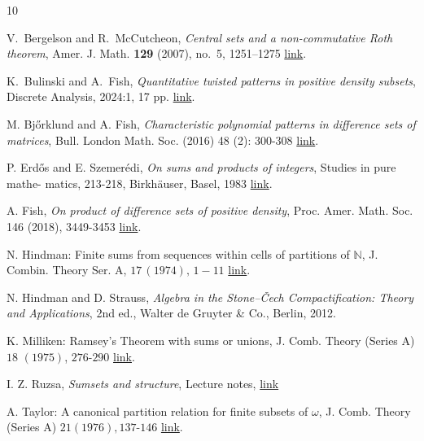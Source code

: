 \documentclass{article}
\theoremstyle{Theorem}
\theoremstyle{definition}
\begin{document}
\begin{thebibliography}{10}

 V.~Bergelson and R.~McCutcheon, \emph{Central sets and a non-commutative Roth theorem}, Amer. J. Math. \textbf{129} (2007), no.~5, 1251--1275 \href{https://doi.org/10.1353/AJM.2007.0031}{link}.

 K.~Bulinski and A.~Fish, \emph{Quantitative twisted patterns in positive density subsets}, Discrete Analysis, 2024:1, 17 pp. \href{https://doi.org/10.48550/arXiv.2102.05862}{link}.

  M. Bj\H{o}rklund and A. Fish, \emph{Characteristic polynomial
patterns in difference sets of matrices}, Bull. London Math. Soc. (2016)
48 (2): 300-308 \href{https://doi.org/10.1112/blms/bdw008}{link}.


 P. Erd\H{o}s and E. Szemer\'{e}di, \emph{On sums and
products of integers}, Studies in pure mathe- matics, 213-218, Birkh\"{a}user,
Basel, 1983 \href{https://doi.org/10.1007/978-3-0348-5438-2_19}{link}.

 A. Fish, \emph{On product of difference sets of positive
density}, Proc. Amer. Math. Soc. 146 (2018), 3449-3453 \href{http://dx.doi.org/10.1090/proc/14078}{link}.

 N. Hindman: Finite sums from sequences within cells
of partitions of $\mathbb{N}$, J. Combin. Theory Ser. A, $17\, (1974),\,
1-11$ \href{https://doi.org/10.1016/0097-3165(74)90023-5}{link}.

 N. Hindman and D. Strauss, \textit{Algebra in the Stone–Čech Compactification: Theory and Applications}, 2nd ed., Walter de Gruyter \& Co., Berlin, 2012.

 K. Milliken: Ramsey’s Theorem with sums or unions, J. Comb. Theory (Series A) $18$ $(1975)$,
$276$-$290$ \href{https://doi.org/10.1016/0097-3165(75)90039-4}{link}.

 I. Z. Ruzsa, \emph{Sumsets and structure}, Lecture notes, \href{https://www.math.cmu.edu/~af1p/Teaching/AdditiveCombinatorics/Additive-Combinatorics.pdf}{link}

  A. Taylor: A canonical partition relation for finite subsets of $\omega$, J. Comb. Theory (Series A) $21 (1976), 137$-$146$ \href{https://doi.org/10.1016/0097-3165(76)90058-3}{link}.

\end{thebibliography}
\end{document}
